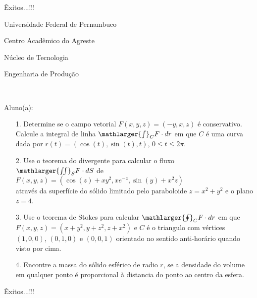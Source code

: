 \documentclass[oneside,a4paper,12pt]{article}
\newcommand{\universidade}{Universidade Federal de Pernambuco}
\newcommand{\centro}{Centro Acadêmico do Agreste}
\newcommand{\departamento}{Núcleo de Tecnologia}
\newcommand{\curso}{Engenharia de Produção}
\begin{document}
	\flushbottom
	\flushright
     Êxitos...!!!
     \begin{center}
     	\vspace{0pt}
     	
     	\universidade
     	\par
     	\centro
     	\par
     	\departamento
     	\par
     	\curso
     	\par
     	\vspace{08pt}
     	\\
     \end{center}
     
     \begin{flushleft}
     	Aluno(a):
     \end{flushleft}
 
 \begin{itemize}
 	\item[1.] Determine se o campo vetorial $F(x,y,z)=(-y,x,z)$ é conservativo. Calcule a integral de linha $\mathlarger{\int}_{C}F\cdot dr$ em que $C$ é uma curva dada por $r(t)=(\cos(t), \sin(t),t)$, $0\leqslant t\leq 2\pi$.
 \end{itemize}
 \begin{itemize}
 	\item[2.] Use o teorema do divergente para calcular o fluxo $\mathlarger{\iint}_{S}F\cdot dS$ de\\ $F(x,y,z)=(\cos(z)+xy^{2},xe^{-z},\sin(y)+x^{2}z)$\\ através da superfície do sólido limitado pelo paraboloide $z=x^2+y^2$ e o plano $z=4$. 
 \end{itemize}
 \begin{itemize}
 	\item [3.] Use o teorema de Stokes para calcular $\mathlarger{\oint}_{C} {F}\cdot dr$ em que\\ 
 	$F(x,y,z)=(x+y^{2},y+z^{2},z+x^{2})$ e $C$ é o triangulo com vértices $(1,0,0)$, $(0,1,0)$ e $(0,0,1)$ orientado no sentido anti-horário quando visto por cima.
 \end{itemize}
 \begin{itemize}
 	\item[4.] Encontre a massa do sólido esférico de radio $r$, se a densidade do volume em qualquer ponto é proporcional à distancia do ponto ao centro da esfera.
 \end{itemize}
\flushbottom
\flushright
Êxitos...!!!
\end{document}
